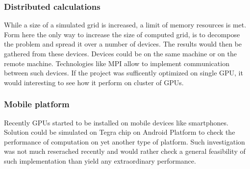 \subsubsection{Distributed calculations}
While a size of a simulated grid is increased, a limit of memory resources is met. Form here the only way to increase the size of computed grid, is to decompose the problem and spread it over a number of devices. The results would then be gathered from these devices. Devices could be on the same machine or on the remote machine. Technologies like MPI allow to implement communication between such devices. If the project was sufficently optimized on single GPU, it would interesting to see how it perform on cluster of GPUs.

\subsubsection{Mobile platform}
Recently GPUs started to be installed on mobile devices like smartphones. Solution could be simulated on Tegra chip on Android Platform to check the performance of computation on yet another type of platform. Such investigation was not much reserached recently and would rather check a general feasibility of such implementation than yield any extraordinary performance.

